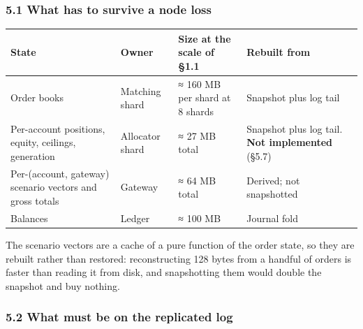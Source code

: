 \documentclass[10pt,a4paper]{article}
\newcounter{none}  %
\begin{document}
\subsubsection{5.1 What has to survive a node loss}\label{what-has-to-survive-a-node-loss}

{\def\LTcaptype{none} %
\begin{longtable}[]{@{}
  >{\raggedright\arraybackslash}p{}
  >{\raggedright\arraybackslash}p{}
  >{\raggedright\arraybackslash}p{}
  >{\raggedright\arraybackslash}p{}@{}}
\toprule\noalign{}
\begin{minipage}[b]{\linewidth}\raggedright
State
\end{minipage} & \begin{minipage}[b]{\linewidth}\raggedright
Owner
\end{minipage} & \begin{minipage}[b]{\linewidth}\raggedright
Size at the scale of §1.1
\end{minipage} & \begin{minipage}[b]{\linewidth}\raggedright
Rebuilt from
\end{minipage} \\
\midrule\noalign{}
\endhead
\bottomrule\noalign{}
\endlastfoot
Order books & Matching shard & ≈ 160 MB per shard at 8 shards & Snapshot plus log tail \\
Per-account positions, equity, ceilings, generation & Allocator shard & ≈ 27 MB total & Snapshot plus log tail. \textbf{Not implemented} (§5.7) \\
Per-(account, gateway) scenario vectors and gross totals & Gateway & ≈ 64 MB total & Derived; not snapshotted \\
Balances & Ledger & ≈ 100 MB & Journal fold \\
\end{longtable}
}

The scenario vectors are a cache of a pure function of the order state, so they
are rebuilt rather than restored: reconstructing 128 bytes from a handful of
orders is faster than reading it from disk, and snapshotting them would double
the snapshot and buy nothing.

\subsubsection{5.2 What must be on the replicated log}\label{what-must-be-on-the-replicated-log}
\end{document}
